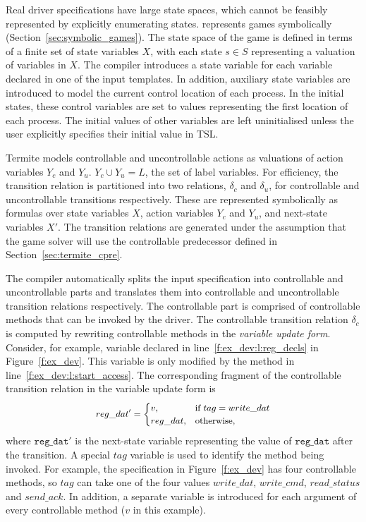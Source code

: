 Real driver specifications have large state spaces, which cannot be feasibly represented by explicitly enumerating states. \termite represents games symbolically (Section~\ref{sec:symbolic_games}).  The state space of the game is defined in terms of a finite set of state variables $X$, with each state $s\in S$ representing a valuation of variables in $X$.  The \tsl compiler introduces a state variable for each \tsl variable declared in one of the input templates.  In addition, auxiliary state variables are introduced to model the current control location of each \tsl process. In the initial states, these control variables are set to values representing the first location of each process. The initial values of other variables are left uninitialised unless the user explicitly specifies their initial value in TSL.
        
Termite models controllable and uncontrollable actions as valuations of action variables $Y_c$ and $Y_u$. $Y_c \cup Y_u = L$, the set of label variables. For efficiency, the transition relation is partitioned into two relations, $\delta_c$ and $\delta_u$, for controllable and uncontrollable transitions respectively. These are represented symbolically as formulas over state variables $X$, action variables $Y_c$ and $Y_u$, and next-state variables $X'$. The transition relations are generated under the assumption that the game solver will use the controllable predecessor defined in Section~\ref{sec:termite_cpre}.

The \tsl compiler automatically splits the input specification into controllable and uncontrollable parts and translates them into controllable and uncontrollable transition relations respectively.  The controllable part is comprised of controllable methods that can be invoked by the driver.  The controllable transition relation $\delta_c$ is computed by rewriting controllable methods in the \emph{variable update form}.  Consider, for example, variable  declared in line~\ref{f:ex_dev:l:reg_decls} in Figure~\ref{f:ex_dev}.  This variable is only modified by the  method in line~\ref{f:ex_dev:l:start_access}. The corresponding fragment of the controllable transition relation in the variable update form is
$$
\small
\begin{aligned}
    &reg\_dat' = \begin{cases}
                     v       , & \text{if } tag=write\_dat \\
                     reg\_dat, & \text{otherwise},
                 \end{cases}\\
\end{aligned}
$$
where $\mathtt{reg\_dat'}$ is the next-state variable representing the value of $\mathtt{reg\_dat}$ after the transition. A special $tag$ variable is used to identify the method being invoked. For example, the specification in Figure~\ref{f:ex_dev} has four controllable methods, so $tag$ can take one of the four values $write\_dat$, $write\_cmd$, $read\_status$ and $send\_ack$.  In addition, a separate variable is introduced for each argument of every controllable method ($v$ in this example). 

